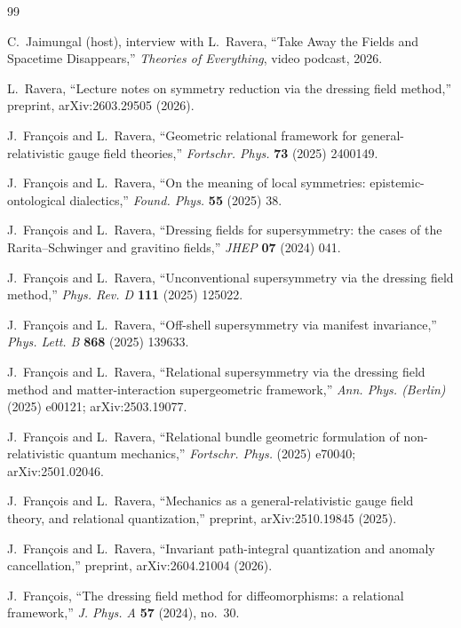 \documentclass[11pt]{article}
\theoremstyle{plain}
\theoremstyle{definition}
\theoremstyle{remark}
\begin{document}
\clearpage
{}
{}
\begin{thebibliography}{99}
\small

 C.~Jaimungal (host), interview with L.~Ravera, ``Take Away the Fields and Spacetime Disappears,'' \emph{Theories of Everything}, video podcast, 2026.

 L.~Ravera, ``Lecture notes on symmetry reduction via the dressing field method,'' preprint, arXiv:2603.29505 (2026).

 J.~François and L.~Ravera, ``Geometric relational framework for general-relativistic gauge field theories,'' \emph{Fortschr. Phys.} \textbf{73} (2025) 2400149.

 J.~François and L.~Ravera, ``On the meaning of local symmetries: epistemic-ontological dialectics,'' \emph{Found. Phys.} \textbf{55} (2025) 38.

 J.~François and L.~Ravera, ``Dressing fields for supersymmetry: the cases of the Rarita--Schwinger and gravitino fields,'' \emph{JHEP} \textbf{07} (2024) 041.

 J.~François and L.~Ravera, ``Unconventional supersymmetry via the dressing field method,'' \emph{Phys. Rev. D} \textbf{111} (2025) 125022.

 J.~François and L.~Ravera, ``Off-shell supersymmetry via manifest invariance,'' \emph{Phys. Lett. B} \textbf{868} (2025) 139633.

 J.~François and L.~Ravera, ``Relational supersymmetry via the dressing field method and matter-interaction supergeometric framework,'' \emph{Ann. Phys. (Berlin)} (2025) e00121; arXiv:2503.19077.

 J.~François and L.~Ravera, ``Relational bundle geometric formulation of non-relativistic quantum mechanics,'' \emph{Fortschr. Phys.} (2025) e70040; arXiv:2501.02046.

 J.~François and L.~Ravera, ``Mechanics as a general-relativistic gauge field theory, and relational quantization,'' preprint, arXiv:2510.19845 (2025).

 J.~François and L.~Ravera, ``Invariant path-integral quantization and anomaly cancellation,'' preprint, arXiv:2604.21004 (2026).

 J.~François, ``The dressing field method for diffeomorphisms: a relational framework,'' \emph{J. Phys. A} \textbf{57} (2024), no.~30.


\end{thebibliography}
\end{document}
